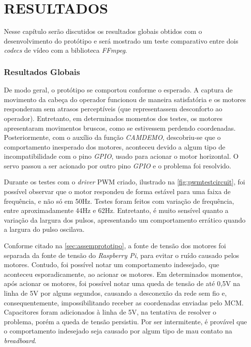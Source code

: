 
\chapter{RESULTADOS}
\label{chap:resultados}

Nesse capítulo serão discutidos os resultados globais obtidos com o desenvolvimento do protótipo e será mostrado um teste comparativo entre dois \textit{codecs} de vídeo com a biblioteca \textit{FFmpeg}.\par

\subsection{Resultados Globais}
\label{subsec:resglobais}

De modo geral, o protótipo se comportou conforme o esperado. A captura de movimento da cabeça do operador funcionou de maneira satisfatória e os motores responderam sem atrasos perceptíveis (que representassem desconforto ao operador). Entretanto, em determinados momentos dos testes, os motores apresentaram movimentos bruscos, como se estivessem perdendo coordenadas. Posteriormente, com o auxílio da função \textit{CAMDEMO}, descobriu-se que o comportamento inesperado dos motores, aconteceu devido a algum tipo de incompatibilidade com o pino \textit{GPIO}, usado para acionar o motor horizontal. O servo passou a ser acionado por outro pino \textit{GPIO} e o problema foi resolvido.\par

Durante os testes com o \textit{driver} PWM criado, ilustrado na \autoref{fig:pwmtestcircuit}, foi possível observar que o motor respondeu de forma estável para uma faixa de frequência, e não só em 50Hz. Testes foram feitos com variação de frequência, entre aproximadamente 44Hz e 62Hz. Entretanto, é muito sensível quanto a variação da largura dos pulsos, apresentando um comportamento errático quando a largura do pulso oscilava.\par

Conforme citado na \autoref{sec:assemprototipo}, a fonte de tensão dos motores foi separada da fonte de tensão do \textit{Raspberry Pi}, para evitar o ruído causado pelos motores. Contudo, foi possível notar um comportamento indesejado, que aconteceu esporadicamente, ao acionar os motores. Em determinados momentos, após acionar os motores, foi possível notar uma queda de tensão de até 0,5V na linha de 5V por alguns segundos, causando a desconexão da rede sem fio e, consequentemente, impossibilitando receber as coordenadas enviadas pelo MCM. Capacitores foram adicionados à linha de 5V, na tentativa de resolver o problema, porém a queda de tensão persistiu. Por ser intermitente, é provável que o comportamento indesejado seja causado por algum tipo de mau contato na \textit{breadboard}. \par

